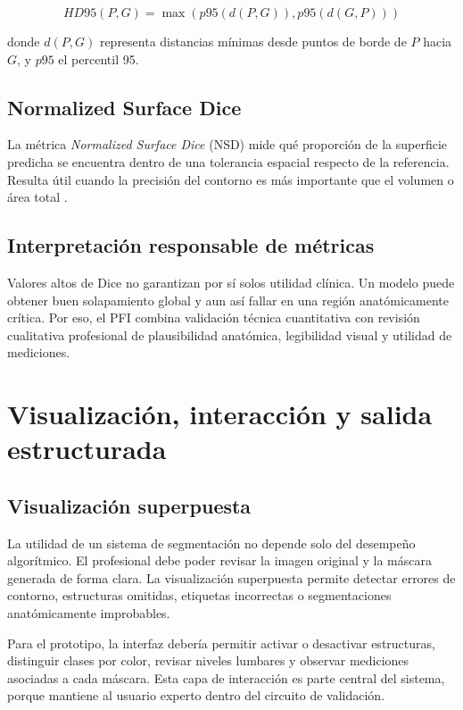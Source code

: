 \begin{equation}
HD95(P,G)=\max\left(p95(d(P,G)),p95(d(G,P))\right)
\end{equation}

donde $d(P,G)$ representa distancias mínimas desde puntos de borde de $P$ hacia $G$, y $p95$ el percentil 95.

\subsection{Normalized Surface Dice}

La métrica \textit{Normalized Surface Dice} (NSD) mide qué proporción de la superficie predicha se encuentra dentro de una tolerancia espacial respecto de la referencia. Resulta útil cuando la precisión del contorno es más importante que el volumen o área total \parencite{maierhein_metrics_reloaded_2024}.

\subsection{Interpretación responsable de métricas}

Valores altos de Dice no garantizan por sí solos utilidad clínica. Un modelo puede obtener buen solapamiento global y aun así fallar en una región anatómicamente crítica. Por eso, el PFI combina validación técnica cuantitativa con revisión cualitativa profesional de plausibilidad anatómica, legibilidad visual y utilidad de mediciones.

\section{Visualización, interacción y salida estructurada}

\subsection{Visualización superpuesta}

La utilidad de un sistema de segmentación no depende solo del desempeño algorítmico. El profesional debe poder revisar la imagen original y la máscara generada de forma clara. La visualización superpuesta permite detectar errores de contorno, estructuras omitidas, etiquetas incorrectas o segmentaciones anatómicamente improbables.

Para el prototipo, la interfaz debería permitir activar o desactivar estructuras, distinguir clases por color, revisar niveles lumbares y observar mediciones asociadas a cada máscara. Esta capa de interacción es parte central del sistema, porque mantiene al usuario experto dentro del circuito de validación.

